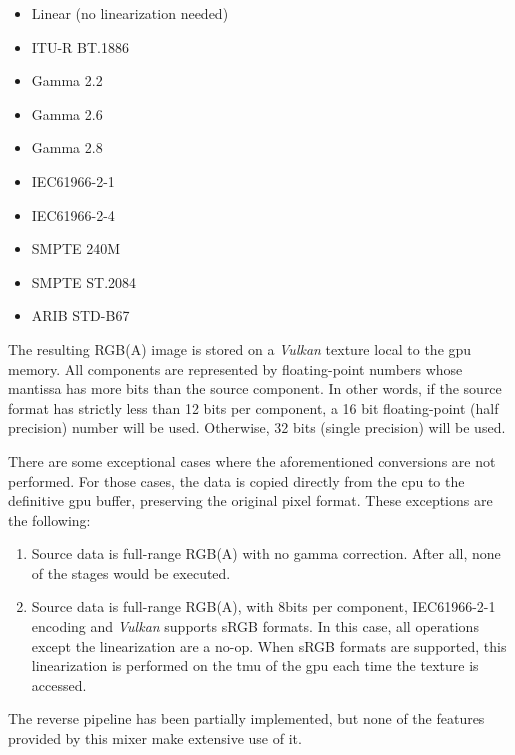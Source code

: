 \documentclass[../main.tex]{subfiles}
\begin{document}
\begin{itemize}
    \item Linear (no linearization needed)
    \item ITU-R BT.1886\cite{bt1886}
    \item Gamma 2.2
    \item Gamma 2.6
    \item Gamma 2.8
    \item IEC61966-2-1\cite{iec61966-2-1}
    \item IEC61966-2-4\cite{iec61966-2-4}
    \item SMPTE 240M\cite{smpte240M} 
    \item SMPTE ST.2084\cite{smpte2084}
    \item ARIB STD-B67\cite{aribStdB67}
\end{itemize}

The resulting RGB(A) image is stored on a \textit{Vulkan} texture local to the \gls{gpu} memory. All components are represented by floating-point numbers whose mantissa has more bits than the source component. In other words, if the source format has strictly less than 12 bits per component, a 16 bit floating-point (half precision) number will be used. Otherwise, 32 bits (single precision) will be used\cite{ieee754}.\newline

There are some exceptional cases where the aforementioned conversions are not performed. For those cases, the data is copied directly from the \gls{cpu} to the definitive \gls{gpu} buffer, preserving the original pixel format. These exceptions are the following:

\begin{enumerate}[label=(\alph*)]
    \item Source data is full-range RGB(A) with no gamma correction. After all, none of the stages would be executed.
    \item Source data is full-range RGB(A), with 8bits per component, IEC61966-2-1 encoding and \textit{Vulkan} supports sRGB formats. In this case, all operations except the linearization are a no-op. When sRGB formats are supported, this linearization is performed on the \gls{tmu} of the \gls{gpu} each time the texture is accessed.
\end{enumerate}

The reverse pipeline has been partially implemented, but none of the features provided by this mixer make extensive use of it.\newline
\end{document}
